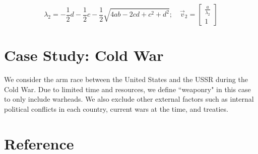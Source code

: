 $$\lambda_2 = -\frac{1}{2}d - \frac{1}{2}c - \frac{1}{2}\sqrt{4ab -2cd + c^2 + d^2}; \quad \vec{v}_2 = 
\begin{bmatrix}
	\frac{a}{\lambda_2}\\
	1
\end{bmatrix} $$

\section{Case Study: Cold War}
We consider the arm race between the United States and the USSR during the Cold War. Due to limited time and resources, we define ``weaponry" in this case to only include warheads. We also exclude other external factors such as internal political conflicts in each country, current wars at the time, and treaties.


\section{Reference}

